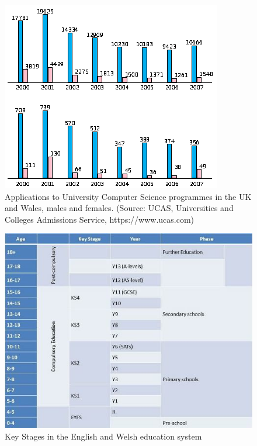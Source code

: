 \documentclass{sig-alternate}
\begin{document}
\begin{figure}
  \centering
  \includegraphics[width=0.9\columnwidth]{images/numbers.png}
  \caption{Applications to University Computer Science programmes
           in the UK and Wales, males and females.
           (Source: UCAS, Universities and Colleges Admissions Service,
            https://www.ucas.com)}
  \label{fig:numbers}
\end{figure}

\begin{figure}
  \centering
  \includegraphics[width=\columnwidth]{images/keystages.png}
  \caption{Key Stages in the English and Welsh education system}
  \label{fig:key-stages}
\end{figure}
\end{document}
